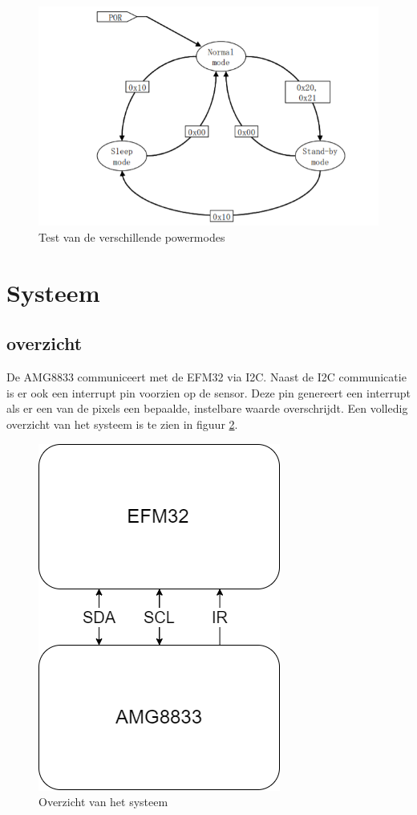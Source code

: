 \documentclass[]{article}
\begin{document}
\begin{figure}[!ht]
	\centering
	\includegraphics{operatingmodes.png}
	\caption{Test van de verschillende powermodes}
	\label{fig:powertest}
\end{figure}
\section{Systeem}
\subsection{overzicht}
De AMG8833 communiceert met de EFM32 via I2C. Naast de I2C communicatie is er ook een interrupt pin voorzien op de sensor. Deze pin genereert een interrupt als er een van de pixels een bepaalde, instelbare waarde overschrijdt. Een volledig overzicht van het systeem is te zien in figuur \ref{fig:systeem}.
\begin{figure}[!ht]
	\centering
	\includegraphics[scale=0.5]{sys.png}
	\caption{Overzicht van het systeem}
	\label{fig:systeem}
\end{figure}
\end{document}
